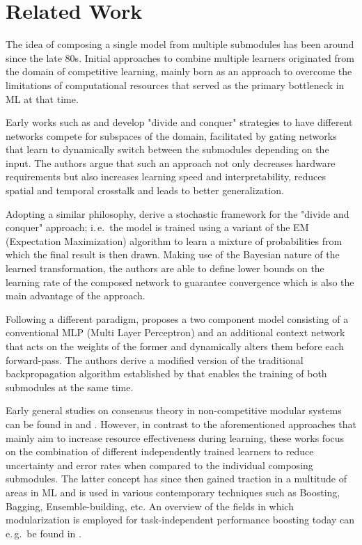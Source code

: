 \cleardoublepage

\section{Related Work%
         \label{sec:related_work}}
         
The idea of composing a single model from multiple submodules has been around since the late 80s. Initial approaches to combine multiple learners originated from the domain of competitive learning, mainly born as an approach to overcome the limitations of computational resources that served as the primary bottleneck in ML at that time.

Early works such as \cite{Jacobs1991-fo} and \cite{Jacobs1991-rz} develop "divide and conquer" strategies to have different networks compete for subspaces of the domain, facilitated by gating networks that learn to dynamically switch between the submodules depending on the input. The authors argue that such an approach not only decreases hardware requirements but also increases learning speed and interpretability, reduces spatial and temporal crosstalk and leads to better generalization.

Adopting a similar philosophy, \cite{Jordan1994-gn} derive a stochastic framework for the "divide and conquer" approach; i.\,e.\ the model is trained using a variant of the EM (Expectation Maximization) algorithm to learn a mixture of probabilities from which the final result is then drawn. Making use of the Bayesian nature of the learned transformation, the authors are able to define lower bounds on the learning rate of the composed network to guarantee convergence which is also the main advantage of the approach.

Following a different paradigm, \cite{Pollack1987-pe} proposes a two component model consisting of a conventional MLP (Multi Layer Perceptron) and an additional context network that acts on the weights of the former and dynamically alters them before each forward-pass. The authors derive a modified version of the traditional backpropagation algorithm established by \cite{Rumelhart1986-jr} that enables the training of both submodules at the same time.

Early general studies on consensus theory in non-competitive modular systems can be found in \cite{Benediktsson1992-bl} and \cite{Xu1992-hp}. However, in contrast to the aforementioned approaches that mainly aim to increase resource effectiveness during learning, these works focus on the combination of different independently trained learners to reduce uncertainty and error rates when compared to the individual composing submodules. The latter concept has since then gained traction in a multitude of areas in ML and is used in various contemporary techniques such as Boosting, Bagging, Ensemble-building, etc. An overview of the fields in which modularization is employed for task-independent performance boosting today can e.\,g.\ be found in \cite{Alpaydin2019-nh}.


